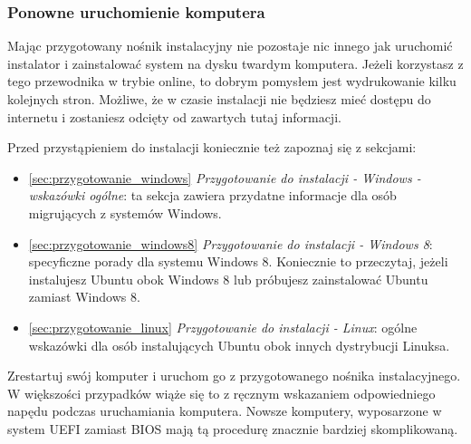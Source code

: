 \subsubsection{Ponowne uruchomienie komputera}
Mając przygotowany nośnik instalacyjny nie pozostaje nic innego jak uruchomić instalator i zainstalować system na dysku twardym komputera. Jeżeli korzystasz z tego przewodnika w trybie online, to dobrym pomysłem jest wydrukowanie kilku kolejnych stron. Możliwe, że w czasie instalacji nie będziesz mieć dostępu do internetu i zostaniesz odcięty od zawartych tutaj informacji.

Przed przystąpieniem do instalacji koniecznie też zapoznaj się z sekcjami:
\begin{itemize}
\item \ref{sec:przygotowanie_windows} \textit{Przygotowanie do instalacji - Windows - wskazówki ogólne}: ta sekcja zawiera przydatne informacje dla osób migrujących z systemów Windows.
\item \ref{sec:przygotowanie_windows8} \textit{Przygotowanie do instalacji - Windows 8}: specyficzne porady dla systemu Windows 8. Koniecznie to przeczytaj, jeżeli instalujesz Ubuntu obok Windows 8 lub próbujesz zainstalować Ubuntu zamiast Windows 8.
\item \ref{sec:przygotowanie_linux} \textit{Przygotowanie do instalacji - Linux}: ogólne wskazówki dla osób instalujących Ubuntu obok innych dystrybucji Linuksa.
\end{itemize}
Zrestartuj swój komputer i uruchom go z przygotowanego nośnika instalacyjnego. W większości przypadków wiąże się to z ręcznym wskazaniem odpowiedniego napędu podczas uruchamiania komputera. Nowsze komputery, wyposarzone w system UEFI zamiast BIOS mają tą procedurę znacznie bardziej skomplikowaną. 

